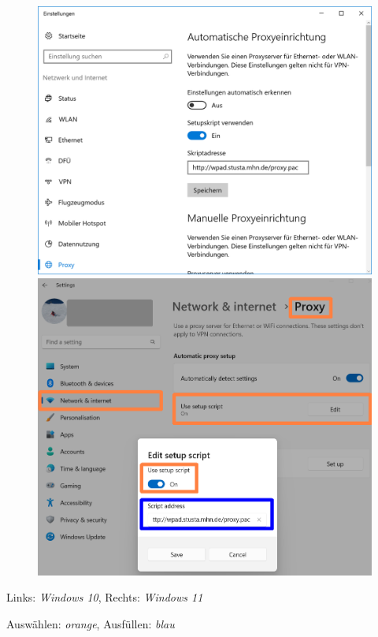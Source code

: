 \documentclass[a4paper,12pt]{scrartcl}
\begin{document}
\begin{figure}[h]
	\centering
	\begin{minipage}{.55\textwidth}
		\centering
		\includegraphics[height=.20\textheight]{Bilder/Proxy_Edge}
	\end{minipage}
	\begin{minipage}{.30\textwidth}
		\centering
		\includegraphics[height=.20\textheight]{Bilder/Win11/proxy_win11}
	\end{minipage}
\end{figure}
\begin{center}
	Links: \textit{Windows 10}, Rechts: \textit{Windows 11}
	
	Auswählen: \textit{orange}, Ausfüllen: \textit{blau}
\end{center}
\end{document}
